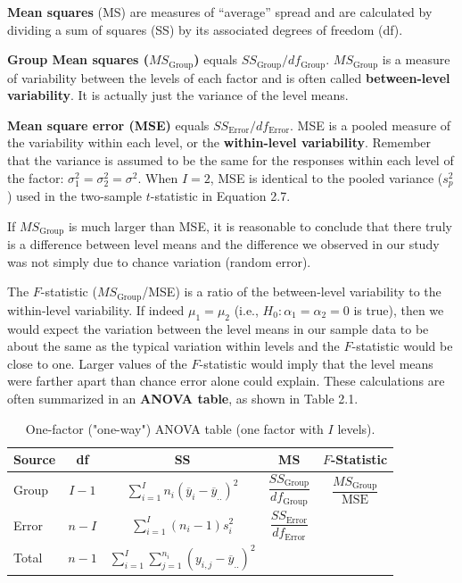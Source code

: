 \documentclass[
]{book}
\begin{document}
\textbf{Mean squares} (MS) are measures of ``average'' spread and are calculated by dividing a sum of squares
(SS) by its associated degrees of freedom (df).

\textbf{Group Mean squares (\(MS_{\text{Group}}\))} equals \(SS_{\text{Group}}/df_{\text{Group}}\). \(MS_{\text{Group}}\) is a measure of variability between the levels of each factor and is often called \textbf{between-level variability}. It is actually just the variance of the level means.

\textbf{Mean square error (MSE)} equals \(SS_{\text{Error}}/df_{\text{Error}}\). MSE is a pooled measure of the variability within each level, or the \textbf{within-level variability}. Remember that the variance is assumed to be the same for the responses within each level of the factor: \(\sigma_1^2 = \sigma_2^2 = \sigma^2\). When \(I = 2\), MSE is identical to the pooled variance (\(s_p^2\)) used in the two-sample \(t\)-statistic in Equation 2.7.

If \(MS_{\text{Group}}\) is much larger than MSE, it is reasonable to conclude that there truly is a difference between level means and the difference we observed in our study was not simply due to chance variation (random error).

The \(F\)-statistic (\(MS_{\text{Group}}\)/MSE) is a ratio of the between-level variability to the within-level variability. If indeed \(\mu_1 = \mu_2\) (i.e., \(H_0\!:\! \alpha_1 = \alpha_2 = 0\) is true), then we would expect the variation between the level means in our sample data to be about the same as the typical variation within levels and the \(F\)-statistic would be close to one. Larger values of the \(F\)-statistic would imply that the level means were farther apart than chance error alone could explain. These calculations are often summarized in an \textbf{ANOVA table}, as shown in Table 2.1.

\begin{table}[!h]
\centering
\caption{\label{tab:tab2}One-factor ("one-way") ANOVA table (one factor with $I$ levels).}
\centering
\begin{tabular}[t]{lcccc}
\toprule
Source & df & SS & MS & $F$-Statistic\\
\midrule
Group & $I-1$ & $\displaystyle\sum_{i=1}^{I} n_i (\overline{y}_i - \overline{y}_{..})^2$ & $\dfrac{SS_{\text{Group}}}{df_{\text{Group}}}$ & $\dfrac{MS_{\text{Group}}}{\text{MSE}}$\\
Error & $n-I$ & $\displaystyle\sum_{i=1}^{I} (n_i-1)s_i^2$ & $\dfrac{SS_{\text{Error}}}{df_{\text{Error}}}$ & \\
Total & $n-1$ & $\displaystyle\sum_{i=1}^I \sum_{j=1}^{n_i} (y_{i,j} - \overline{y}_{..})^2$ &  & \\
\bottomrule
\end{tabular}
\end{table}
\end{document}
